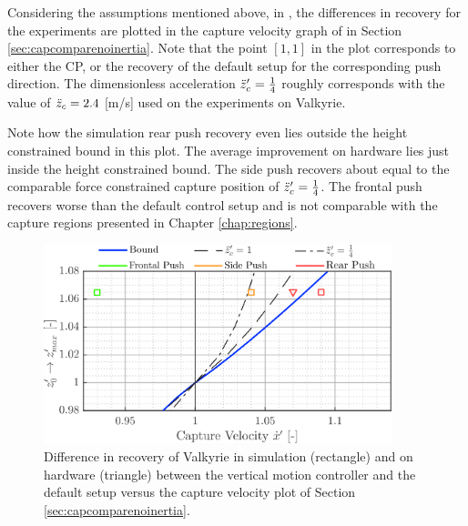 Considering the assumptions mentioned above, in , the differences in recovery for the experiments are plotted in the capture velocity graph of  in Section \ref{sec:capcomparenoinertia}. Note that the point $[1,1]$ in the plot corresponds to either the \ac{CP}, or the recovery of the default setup for the corresponding push direction. The dimensionless acceleration $\ddot{z}_{c}'=\frac{1}{4}$ roughly corresponds with the value of $\ddot{z}_{c}=2.4$ [m/s] used on the experiments on Valkyrie. 

Note how the simulation rear push recovery even lies outside the height constrained bound in this plot. The average improvement on hardware lies just inside the height constrained bound. The side push recovers about equal to the comparable force constrained capture position of $\ddot{z}_{c}'=\frac{1}{4}$. The frontal push recovers worse than the default control setup and is not comparable with the capture regions presented in Chapter \ref{chap:regions}.
\begin{figure}[h]
\centering
\includegraphics[width=0.9\textwidth]{STYLESTUFF/regioncomparison.png}
\caption{Difference in recovery of Valkyrie in simulation (rectangle) and on hardware (triangle) between the vertical motion controller and the default setup versus the capture velocity plot of Section \ref{sec:capcomparenoinertia}.}
\label{fig:regioncomparison}
\end{figure}

